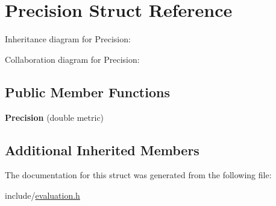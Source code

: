 \hypertarget{structPrecision}{}\section{Precision Struct Reference}
\label{structPrecision}


Inheritance diagram for Precision\+:


Collaboration diagram for Precision\+:
\subsection*{Public Member Functions}
\begin{DoxyCompactItemize}
\item 
\mbox{\label{structPrecision_a3c6a72cd131bc83b74df6c489777f39c}} 
{\bfseries Precision} (double metric)
\end{DoxyCompactItemize}
\subsection*{Additional Inherited Members}


The documentation for this struct was generated from the following file\+:\begin{DoxyCompactItemize}
\item 
include/\hyperlink{evaluation_8h}{evaluation.\+h}\end{DoxyCompactItemize}
